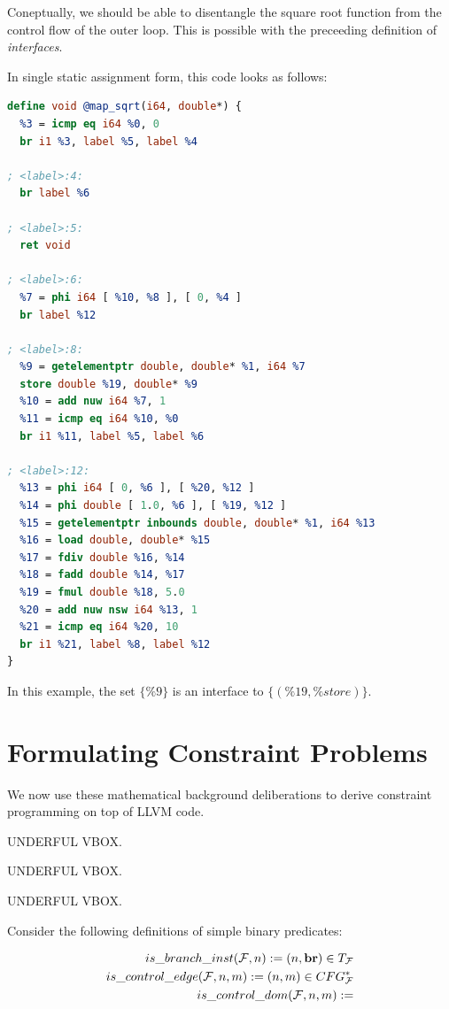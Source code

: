     Coneptually, we should be able to disentangle the square root function from
    the control flow of the outer loop.
    This is possible with the preceeding definition of {\em interfaces}.


\newpage
In single static assignment form, this code looks as follows:

\begin{lstlisting}[language=LLVM]
define void @map_sqrt(i64, double*) {
  %3 = icmp eq i64 %0, 0
  br i1 %3, label %5, label %4

; <label>:4:
  br label %6

; <label>:5:
  ret void

; <label>:6:
  %7 = phi i64 [ %10, %8 ], [ 0, %4 ]
  br label %12

; <label>:8:
  %9 = getelementptr double, double* %1, i64 %7
  store double %19, double* %9
  %10 = add nuw i64 %7, 1
  %11 = icmp eq i64 %10, %0
  br i1 %11, label %5, label %6

; <label>:12:
  %13 = phi i64 [ 0, %6 ], [ %20, %12 ]
  %14 = phi double [ 1.0, %6 ], [ %19, %12 ]
  %15 = getelementptr inbounds double, double* %1, i64 %13
  %16 = load double, double* %15
  %17 = fdiv double %16, %14
  %18 = fadd double %14, %17
  %19 = fmul double %18, 5.0
  %20 = add nuw nsw i64 %13, 1
  %21 = icmp eq i64 %20, 10
  br i1 %21, label %8, label %12
}
\end{lstlisting}

    In this example, the set $\{\%9\}$ is an interface to $\{(\%19,\%store)\}$.

\section{Formulating Constraint Problems}

    We now use these mathematical background deliberations to derive
    constraint programming on top of LLVM code.

    UNDERFUL VBOX.

    UNDERFUL VBOX.

    UNDERFUL VBOX.

    Consider the following definitions of simple binary predicates:

    \begin{align*}
     is\_branch\_inst(\mathcal F, n):= (n,\text{\bf br})\in T_\mathcal{F}\\
     is\_control\_edge(\mathcal F, n, m):= (n,m)\in CFG_\mathcal{F}^*\\
     is\_control\_dom(\mathcal F, n, m):= \\
    \end{align*}

